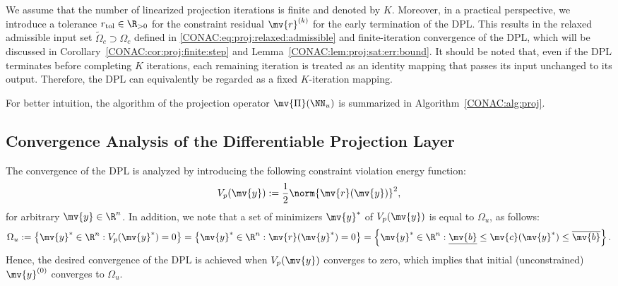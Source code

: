 We assume that the number of linearized projection iterations is finite and denoted by $K$.
Moreover, in a practical perspective, we introduce a tolerance $r_{\mathrm{tol}}\in\R_{>0}$ for the constraint residual $\mv{r}^{(k)}$ for the early termination of the DPL.
This results in the relaxed admissible input set $\tilde{\Omega}_c\supset\Omega_c$ defined in \eqref{CONAC:eq:proj:relaxed:admissible} and finite-iteration convergence of the DPL, which will be discussed in Corollary~\ref{CONAC:cor:proj:finite:step} and Lemma~\ref{CONAC:lem:proj:sat:err:bound}.
It should be noted that, even if the DPL terminates before completing $K$ iterations, each remaining iteration is treated as an identity mapping that passes its input unchanged to its output. 
Therefore, the DPL can equivalently be regarded as a fixed $K$-iteration mapping.

For better intuition, the algorithm of the projection operator $\mv{\Pi}(\NN_u)$ is summarized in Algorithm~\ref{CONAC:alg:proj}.

\subsection{Convergence Analysis of the Differentiable Projection Layer}

The convergence of the DPL is analyzed by introducing the following constraint violation energy function:
\begin{equation}
  \label{CONAC:eq:proj:Vp}
  V_p(\mv{y})
  :=
  \frac{1}{2}
  \norm{\mv{r}(\mv{y})}^2
  ,
\end{equation}
for arbitrary $\mv{y}\in\R^{n}$.
In addition, we note that a set of minimizers $\mv{y}^*$ of $V_p(\mv{y})$ is equal to $\Omega_u$, as follows:
\begin{equation}
  \label{CONAC:eq:proj:Vp:minimizer}
  \Omega_u  
  :=
  \left\{
    \mv{y}^*\in\R^{n}
    :
    V_p(\mv{y}^*) = 0
  \right\}
  =
  \left\{
    \mv{y}^*\in\R^{n}
    :
    \mv{r}(\mv{y}^*) = 0
  \right\}
  =
  \left\{
    \mv{y}^*\in\R^{n}
    :
    \underline{\mv{b}} \le \mv{c}(\mv{y}^*) \le \overline{\mv{b}}
  \right\}
  .
\end{equation}
Hence, the desired convergence of the DPL is achieved when $V_p(\mv{y})$ converges to zero, which implies that initial (unconstrained) $\mv{y}^{(0)}$ converges to $\Omega_u$.

\par\medskip

